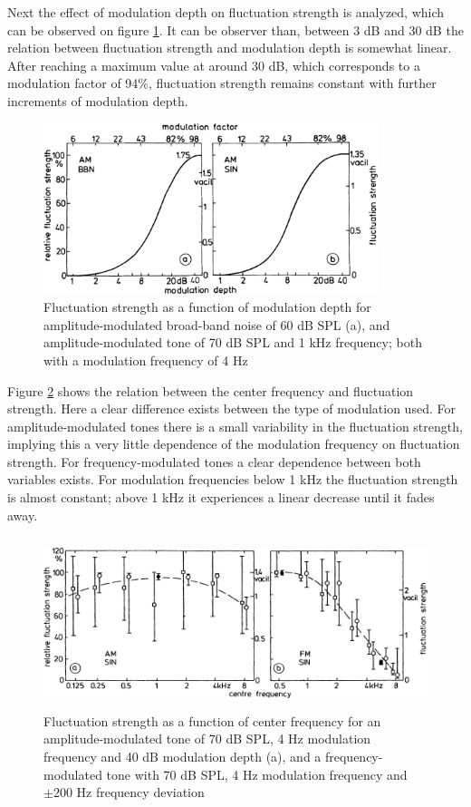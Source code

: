 Next the effect of modulation depth on fluctuation strength is analyzed, which
can be observed on figure \ref{fig:flucstrenvsmoddep}. It can be observer than,
between 3 dB and 30 dB the relation between fluctuation strength and modulation
depth is somewhat linear. After reaching a maximum value at around 30 dB, which
corresponds to a modulation factor of 94\%, fluctuation strength remains
constant with further increments of modulation depth.

\begin{figure}
    \centering
    \includegraphics[height=5cm]
        {img/Fastl2007-FluctuationStrengthVsModulationDepth}
    \caption{Fluctuation strength as a function of modulation depth for
        amplitude-modulated broad-band noise of 60 dB SPL (a), and
        amplitude-modulated tone of 70 dB SPL and 1 kHz frequency; both with a
        modulation frequency of 4 Hz \cite[pp. 249]{Fastl2007Psychoacoustics}}
    \label{fig:flucstrenvsmoddep}
\end{figure}

Figure \ref{fig:flucstrenvscfreq} shows the relation between the center
frequency and fluctuation strength. Here a clear difference exists between the
type of modulation used. For amplitude-modulated tones there is a small
variability in the fluctuation strength, implying this a very little dependence
of the modulation frequency on fluctuation strength. For frequency-modulated
tones a clear dependence between both variables exists. For modulation
frequencies below 1 kHz the fluctuation strength is almost constant; above 1 kHz
it experiences a linear decrease until it fades away.

\begin{figure}
    \centering
    \includegraphics[height=5cm]
        {img/Fastl2007-FluctuationStrengthVsCenterFrequency}
    \caption{Fluctuation strength as a function of center frequency for an
        amplitude-modulated tone of 70 dB SPL, 4 Hz modulation frequency and 40
        dB modulation depth (a), and a frequency-modulated tone with 70 dB SPL,
        4 Hz modulation frequency and $\pm200$ Hz frequency deviation
        \cite[pp. 250]{Fastl2007Psychoacoustics}}
    \label{fig:flucstrenvscfreq}
\end{figure}

